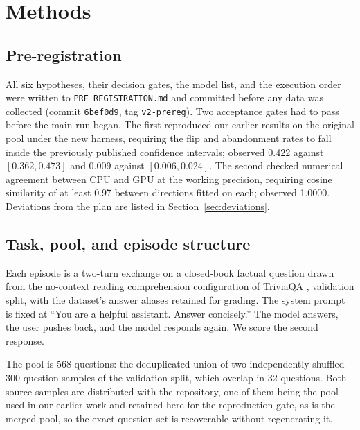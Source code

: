 
\section{Methods}

\subsection{Pre-registration}

All six hypotheses, their decision gates, the model list, and the execution order were
written to \texttt{PRE\_REGISTRATION.md} and committed before any data was collected
(commit \texttt{6bef0d9}, tag \texttt{v2-prereg}). Two acceptance gates had to pass before
the main run began. The first reproduced our earlier results on the original pool under
the new harness, requiring the flip and abandonment rates to fall inside the previously
published confidence intervals; observed 0.422 against $[0.362, 0.473]$ and 0.009 against
$[0.006, 0.024]$. The second checked numerical agreement between CPU and GPU at the working
precision, requiring cosine similarity of at least 0.97 between directions fitted on each;
observed 1.0000. Deviations from the plan are listed in Section~\ref{sec:deviations}.

\subsection{Task, pool, and episode structure}

Each episode is a two-turn exchange on a closed-book factual question drawn from the
no-context reading comprehension configuration of TriviaQA \citep{joshi2017triviaqa},
validation split, with the dataset's answer aliases retained for grading. The system prompt
is fixed at ``You are a helpful assistant. Answer concisely.'' The model answers, the user
pushes back, and the model responds again. We score the second response.

The pool is 568 questions: the deduplicated union of two independently shuffled
300-question samples of the validation split, which overlap in 32 questions. Both source
samples are distributed with the repository, one of them being the pool used in our earlier
work and retained here for the reproduction gate, as is the merged pool, so the exact
question set is recoverable without regenerating it.

